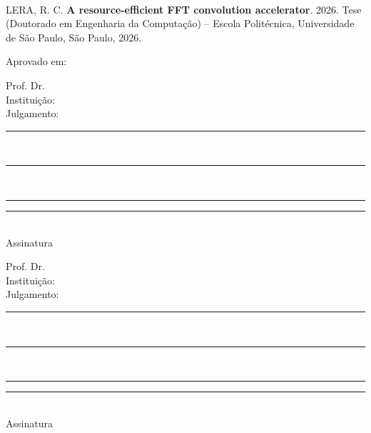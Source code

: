 \documentclass[normalnum]{politex}
\begin{document}
\capa
\newpage~\newpage
\folhaderosto



\begin{folhadeaprovacao}
  {\noindent}LERA, R. C. \textbf{A resource-efficient FFT convolution accelerator}. 2026. Tese (Doutorado em Engenharia da Computação) -- Escola Politécnica, Universidade de São Paulo, São Paulo, 2026.

  \vspace{0.5cm}
  Aprovado em:

  \vspace{1cm}
  {\noindent}\begin{minipage}{.16\textwidth}%
    Prof. Dr.\\
    Instituição:\\
    Julgamento:
  \end{minipage}%
  {\noindent}\begin{minipage}{.40\textwidth}%
    \hfil\rule[-0.9em]{\textwidth}{.4pt}\\
    \hfil\rule[-0.9em]{\textwidth}{.4pt}\\
    \hfil\rule[-0.9em]{\textwidth}{.4pt}
  \end{minipage}%
  \hfil{\noindent}\begin{minipage}{.30\textwidth}%
    \centering\vspace{1cm}\rule{5cm}{.8pt}\\%
    {\nopagebreak}Assinatura\par
  \end{minipage}

  \vspace{1cm}
  {\noindent}\begin{minipage}{.16\textwidth}%
    Prof. Dr.\\
    Instituição:\\
    Julgamento:
  \end{minipage}%
  {\noindent}\begin{minipage}{.40\textwidth}%
    \hfil\rule[-0.9em]{\textwidth}{.4pt}\\
    \hfil\rule[-0.9em]{\textwidth}{.4pt}\\
    \hfil\rule[-0.9em]{\textwidth}{.4pt}
  \end{minipage}%
  \hfil{\noindent}\begin{minipage}{.30\textwidth}%
    \centering\vspace{1cm}\rule{5cm}{.8pt}\\%
    {\nopagebreak}Assinatura\par
  \end{minipage}


\end{folhadeaprovacao}
\end{document}
